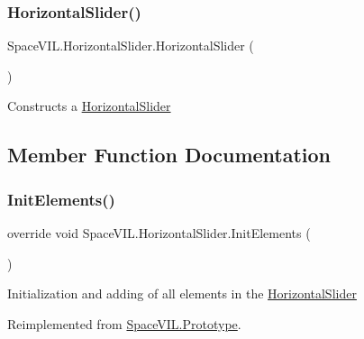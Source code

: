 \subsubsection{\texorpdfstring{Horizontal\+Slider()}{HorizontalSlider()}}
{\footnotesize\ttfamily Space\+V\+I\+L.\+Horizontal\+Slider.\+Horizontal\+Slider (\begin{DoxyParamCaption}{ }\end{DoxyParamCaption})}



Constructs a \mbox{\hyperlink{class_space_v_i_l_1_1_horizontal_slider}{Horizontal\+Slider}} 



\subsection{Member Function Documentation}
\mbox{\label{class_space_v_i_l_1_1_horizontal_slider_a6b0ab83eeb781a73e8196b744564cd3e}} 
\subsubsection{\texorpdfstring{Init\+Elements()}{InitElements()}}
{\footnotesize\ttfamily override void Space\+V\+I\+L.\+Horizontal\+Slider.\+Init\+Elements (\begin{DoxyParamCaption}{ }\end{DoxyParamCaption})\hspace{0.3cm}{\ttfamily [virtual]}}



Initialization and adding of all elements in the \mbox{\hyperlink{class_space_v_i_l_1_1_horizontal_slider}{Horizontal\+Slider}} 



Reimplemented from \mbox{\hyperlink{class_space_v_i_l_1_1_prototype_ac3379fe02923ee155b5b0084abf27420}{Space\+V\+I\+L.\+Prototype}}.

\mbox{\label{class_space_v_i_l_1_1_horizontal_slider_a739410ddc3a5391b3ead36097cf2a760}} 
